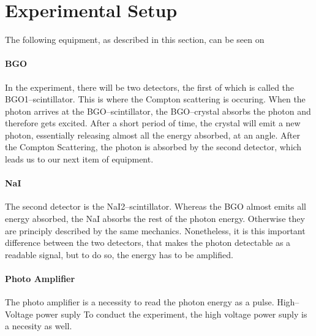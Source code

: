 \section{Experimental Setup}
The following equipment, as described in this section, can be seen on

\paragraph{BGO} In the experiment, there will be two detectors, the first of
which is called the BGO1–scintillator.  This is where the Compton scattering is
occuring. When the photon arrives at the BGO–scintillator, the BGO–crystal
absorbs the photon and therefore gets excited. After a short period of time,
the crystal will emit a new photon, essentially releasing almost all the energy
absorbed, at an angle.  After the Compton Scattering, the photon is absorbed by
the second detector, which leads us to our next item of equipment.

\paragraph{NaI} The second detector is the NaI2–scintillator. Whereas the BGO
almost emits all energy absorbed, the NaI absorbs the rest of the photon
energy. Otherwise they are principly described by the same mechanics.
Nonetheless, it is this important difference between the two detectors, that
makes the photon detectable as a readable signal, but to do so, the energy has
to be amplified.

\paragraph{Photo Amplifier}%
\label{par:photo_amplifier}
The photo amplifier is a necessity to read the photon energy as a pulse.
High–Voltage power suply To conduct the experiment, the high voltage power
suply is a necesity as well.
